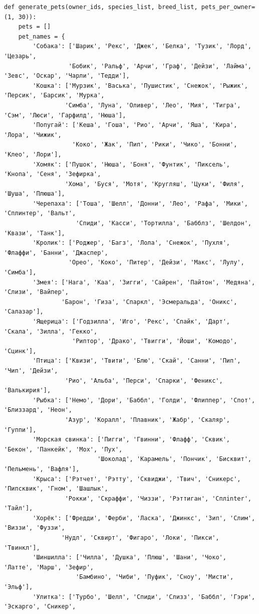\documentclass[a4paper]{article}
\begin{document}
\begin{lstlisting}[caption = Генерация значений для таблиц, basicstyle= \scriptsize \ttfamily]
def generate_pets(owner_ids, species_list, breed_list, pets_per_owner=(1, 30)):
    pets = []
    pet_names = {
        'Собака': ['Шарик', 'Рекс', 'Джек', 'Белка', 'Тузик', 'Лорд', 'Цезарь', 
                  'Бобик', 'Ральф', 'Арчи', 'Граф', 'Дейзи', 'Лайма', 'Зевс', 'Оскар', 'Чарли', 'Тедди'],
        'Кошка': ['Мурзик', 'Васька', 'Пушистик', 'Снежок', 'Рыжик', 'Персик', 'Барсик', 'Мурка',
                 'Симба', 'Луна', 'Оливер', 'Лео', 'Мия', 'Тигра', 'Сэм', 'Люси', 'Гарфилд', 'Нюша'],
        'Попугай': ['Кеша', 'Гоша', 'Рио', 'Арчи', 'Яша', 'Кира', 'Лора', 'Чижик',
                   'Коко', 'Жак', 'Пип', 'Рики', 'Чико', 'Бонни', 'Клео', 'Лори'],
        'Хомяк': ['Пушок', 'Нюша', 'Боня', 'Фунтик', 'Пиксель', 'Кнопа', 'Сеня', 'Зефирка',
                 'Хома', 'Буся', 'Мотя', 'Кругляш', 'Цуки', 'Филя', 'Шуша', 'Плюша'],
        'Черепаха': ['Тоша', 'Шелл', 'Донни', 'Лео', 'Рафа', 'Мики', 'Сплинтер', 'Вальт',
                    'Спиди', 'Касси', 'Тортилла', 'Бабблз', 'Шелдон', 'Квази', 'Танк'],
        'Кролик': ['Роджер', 'Багз', 'Лола', 'Снежок', 'Пухля', 'Флаффи', 'Банни', 'Джаспер',
                  'Орео', 'Коко', 'Питер', 'Дейзи', 'Макс', 'Лулу', 'Симба'],
        'Змея': ['Нага', 'Каа', 'Зигги', 'Сайрен', 'Пайтон', 'Медяна', 'Слизи', 'Вайпер',
                'Барон', 'Гиза', 'Спаркл', 'Эсмеральда', 'Оникс', 'Салазар'],
        'Ящерица': ['Годзилла', 'Иго', 'Рекс', 'Спайк', 'Дарт', 'Скала', 'Зилла', 'Гекко',
                   'Риптор', 'Драко', 'Твигги', 'Йоши', 'Комодо', 'Сцинк'],
        'Птица': ['Квизи', 'Твити', 'Блю', 'Скай', 'Санни', 'Пип', 'Чип', 'Дейзи',
                 'Рио', 'Альба', 'Перси', 'Спарки', 'Феникс', 'Валькирия'],
        'Рыбка': ['Немо', 'Дори', 'Баббл', 'Голди', 'Флиппер', 'Спот', 'Близзард', 'Неон',
                 'Азур', 'Коралл', 'Плавник', 'Жабр', 'Скаляр', 'Гуппи'],
        'Морская свинка': ['Пигги', 'Гвинни', 'Флафф', 'Сквик', 'Бекон', 'Панкейк', 'Мох', 'Пух',
                          'Шоколад', 'Карамель', 'Пончик', 'Бисквит', 'Пельмень', 'Вафля'],
        'Крыса': ['Рэтчет', 'Рэтту', 'Сквиджи', 'Твич', 'Сникерс', 'Пипсквик', 'Гном', 'Шашлык',
                 'Рокки', 'Скраффи', 'Чиззи', 'Рэттиган', 'Сплinter', 'Тайл'],
        'Хорёк': ['Фредди', 'Ферби', 'Ласка', 'Джинкс', 'Зип', 'Слим', 'Виззи', 'Фуззи',
                'Нудл', 'Сквирт', 'Фигаро', 'Локи', 'Пикси', 'Твинкл'],
        'Шиншилла': ['Чилла', 'Душка', 'Плюш', 'Шани', 'Чоко', 'Латте', 'Марш', 'Зефир',
                    'Бамбино', 'Чиби', 'Пуфик', 'Сноу', 'Мисти', 'Эльф'],
        'Улитка': ['Турбо', 'Шелл', 'Спиди', 'Слизз', 'Баббл', 'Гэри', 'Эскарго', 'Сникер',

\end{lstlisting}
\end{document}
